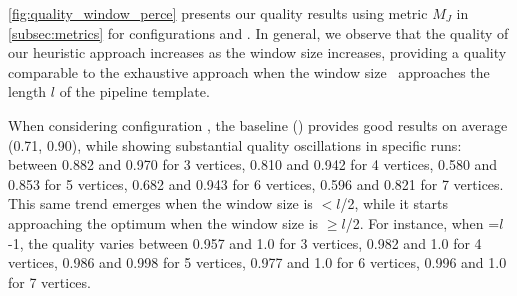       {\color{OurColor2}\cref{fig:quality_window_perce} presents}  our quality results using metric $M_J$ in \cref{subsec:metrics} for configurations \wide and \average.
    In general, we observe that the quality of our heuristic approach increases as the window size increases, providing a quality comparable to the exhaustive approach when the window size \windowsize\ approaches the length $l$ of the pipeline template.

    When considering configuration \wide, the baseline () provides good results on average (0.71, 0.90), while showing substantial quality oscillations in specific runs: between 0.882 and 0.970 for 3 vertices, 0.810 and 0.942 for 4 vertices, 0.580 and 0.853 for 5 vertices, 0.682 and 0.943 for 6 vertices, 0.596 and 0.821 for 7 vertices. This same trend emerges when the window size is $<$$l$/2, while it starts approaching the optimum when the window size is $\geq$$l$/2. For instance, when \windowsize=$l$-1, the quality varies between 0.957 and 1.0 for 3 vertices, 0.982 and 1.0 for 4 vertices, 0.986 and 0.998 for 5 vertices, 0.977 and 1.0 for 6 vertices, 0.996 and 1.0 for 7 vertices.

